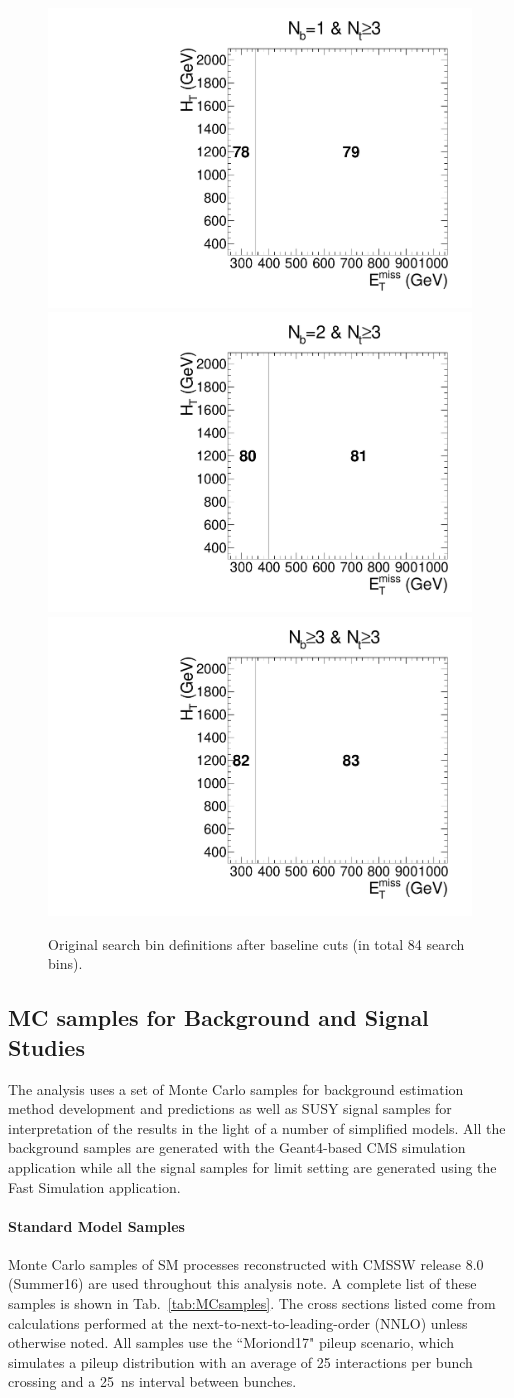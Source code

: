 \begin{figure}[h]
\begin{center}
    \includegraphics[width=0.30\linewidth]{sections/mc4/EvtSelSBOpt/figures/poly_MT2_vs_met_6.pdf} 
    \includegraphics[width=0.30\linewidth]{sections/mc4/EvtSelSBOpt/figures/poly_MT2_vs_met_7.pdf} 
    \includegraphics[width=0.30\linewidth]{sections/mc4/EvtSelSBOpt/figures/poly_MT2_vs_met_8.pdf} \\
    \caption{Original search bin definitions after baseline cuts (in total 84 search bins). }
    \label{fig:SBXX}
  \end{center}
\end{figure}

\subsection{MC samples for Background and Signal Studies}
\label{sec:sm-mc}

The analysis uses a set of Monte Carlo samples for background estimation method
development and predictions as well as SUSY signal samples for interpretation
of the results in the light of a number of simplified models. All the
background samples are generated with the Geant4-based CMS simulation 
application while all the signal samples for limit setting are generated
using the Fast Simulation application.

\paragraph{Standard Model Samples}

Monte Carlo samples of SM processes reconstructed with CMSSW release 8.0 
(Summer16) are used throughout this analysis note.
A complete list of these samples is shown in Tab.~\ref{tab:MCsamples}. 
The cross sections listed come from calculations performed at the 
next-to-next-to-leading-order (NNLO) unless otherwise noted.
All samples use the ``Moriond17" pileup scenario, which simulates a pileup 
distribution with an average of 25 interactions per bunch crossing and a 
25~ns interval between bunches.

